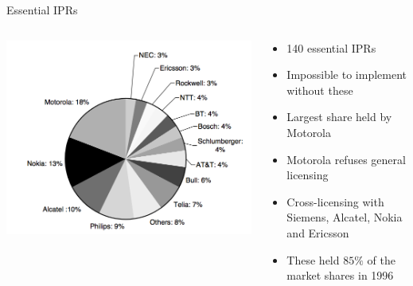 \begin{frame}{Essential IPRs}
  \begin{columns}
      \begin{column}{0.6\textwidth}
          \includegraphics[width=\textwidth]{pictures/iprs}
      \end{column}
      \hfill
    
      \begin{column}{0.4\textwidth}
          \begin{itemize}
              \item 140 essential IPRs
              \item Impossible to implement without these 
              \item Largest share held by Motorola
              \item Motorola refuses general licensing
              \item Cross-licensing with Siemens, Alcatel, Nokia and Ericsson
              \item These held $85\%$ of the market shares in 1996 
          \end{itemize}
      \end{column}
      \end{columns}
\end{frame}


